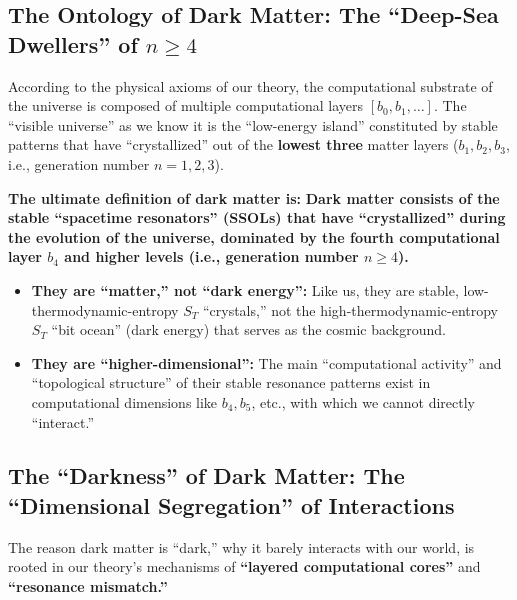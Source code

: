\documentclass[11pt, a4paper]{article}
\begin{document}
\subsection{The Ontology of Dark Matter: The ``Deep-Sea Dwellers'' of $n \ge 4$}
According to the physical axioms of our theory, the computational substrate of the universe is composed of multiple computational layers $[b_0, b_1, \dots]$. The ``visible universe'' as we know it is the ``low-energy island'' constituted by stable patterns that have ``crystallized'' out of the \textbf{lowest three} matter layers ($b_1, b_2, b_3$, i.e., generation number $n=1, 2, 3$).

\textbf{The ultimate definition of dark matter is:}
\textbf{Dark matter consists of the stable ``spacetime resonators'' (SSOLs) that have ``crystallized'' during the evolution of the universe, dominated by the fourth computational layer $b_4$ and higher levels (i.e., generation number $n \ge 4$).}

\begin{itemize}
    \item \textbf{They are ``matter,'' not ``dark energy'':} Like us, they are stable, low-thermodynamic-entropy $S_T$ ``crystals,'' not the high-thermodynamic-entropy $S_T$ ``bit ocean'' (dark energy) that serves as the cosmic background.
    \item \textbf{They are ``higher-dimensional'':} The main ``computational activity'' and ``topological structure'' of their stable resonance patterns exist in computational dimensions like $b_4, b_5$, etc., with which we cannot directly ``interact.''
\end{itemize}

\subsection{The ``Darkness'' of Dark Matter: The ``Dimensional Segregation'' of Interactions}
The reason dark matter is ``dark,'' why it barely interacts with our world, is rooted in our theory's mechanisms of \textbf{``layered computational cores''} and \textbf{``resonance mismatch.''}
\end{document}
